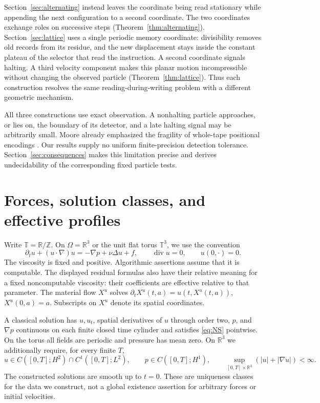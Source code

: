 \documentclass[11pt]{article}
\theoremstyle{remark}
\newcommand{\R}{\mathbb R}
\newcommand{\T}{\mathbb T}
\newcommand{\Z}{\mathbb Z}
\DeclareMathOperator{\diver}{div}
\begin{document}
Section~\ref{sec:alternating} instead leaves the coordinate being read
stationary while appending the next configuration to a second coordinate.
The two coordinates exchange roles on successive steps
(Theorem~\ref{thm:alternating}). Section~\ref{sec:lattice} uses a single
periodic memory coordinate: divisibility removes old records from its
residue, and the new displacement stays inside the constant plateau of
the selector that read the instruction. A second coordinate signals
halting. A third velocity component makes this planar motion incompressible
without changing the observed particle
(Theorem~\ref{thm:lattice}). Thus each construction resolves the same
reading-during-writing problem with a different geometric mechanism.

All three constructions use exact observation. A nonhalting particle
approaches, or lies on, the boundary of its detector, and a late halting
signal may be arbitrarily small. Moore already emphasized the fragility
of whole-tape positional encodings \cite[Section~7]{Moore}.
Our results supply no uniform finite-precision detection tolerance.
Section~\ref{sec:consequences} makes this limitation precise and derives
undecidability of the corresponding fixed particle tests.

\section{Forces, solution classes, and effective profiles}\label{sec:analytic}

Write $\T=\R/\Z$. On $\Omega=\R^3$ or the unit flat torus $\T^3$,
we use the convention
\begin{equation}\label{eq:NS}
 \partial_tu+(u\cdot\nabla)u=-\nabla p+\nu\Delta u+f,
 \qquad \diver u=0,\qquad u(0,\cdot)=0.
\end{equation}
The viscosity is fixed and positive. Algorithmic assertions assume
that it is computable. The displayed residual formulas also have their
relative meaning for a fixed noncomputable viscosity: their coefficients
are effective relative to that parameter.
The material flow $X^u$ solves
$\partial_tX^u(t,a)=u(t,X^u(t,a))$, $X^u(0,a)=a$.
Subscripts on $X^u$ denote its spatial coordinates.

A classical solution has $u,u_t$, spatial derivatives of $u$ through
order two, $p$, and $\nabla p$ continuous on each finite closed time
cylinder and satisfies \eqref{eq:NS} pointwise. On the torus all fields
are periodic and pressure has mean zero. On $\R^3$ we additionally require,
for every finite $T$,
\begin{equation}\label{eq:energy-class}
 u\in C([0,T];H^2)\cap C^1([0,T];L^2),\qquad
 p\in C([0,T];H^1),\qquad
 \sup_{[0,T]\times\R^3}(|u|+|\nabla u|)<\infty.
\end{equation}
The constructed solutions are smooth up to $t=0$. These are uniqueness
classes for the data we construct, not a global existence assertion for
arbitrary forces or initial velocities.
\end{document}
